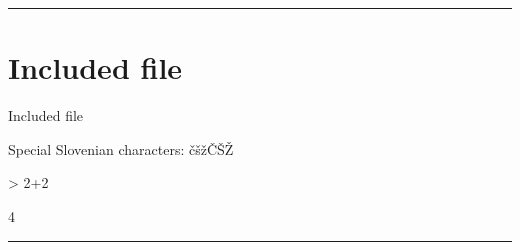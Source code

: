 \hrule
\usepackage[utf8]{inputenc} %

\section{Included file}
Included file

Special Slovenian characters: čšžČŠŽ

\begin{Schunk}
\begin{Sinput}
> 2+2
\end{Sinput}
\begin{Soutput}
[1] 4
\end{Soutput}
\end{Schunk}

\hrule
